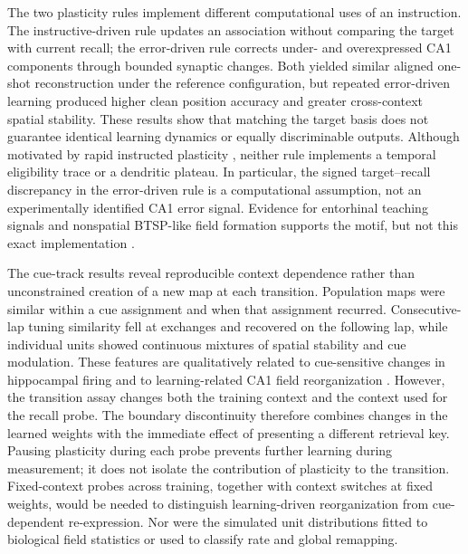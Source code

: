 The two plasticity rules implement different computational uses of an
instruction. The instructive-driven rule updates an association without
comparing the target with current recall; the error-driven rule corrects
under- and overexpressed CA1 components through bounded synaptic changes.
Both yielded similar aligned one-shot reconstruction under the reference
configuration, but repeated error-driven learning produced higher clean
position accuracy and greater cross-context spatial stability. These results
show that matching the target basis does not guarantee identical learning
dynamics or equally discriminable outputs. Although motivated by rapid
instructed plasticity \citep{bittner2017,milstein2021,wu2025}, neither rule
implements a temporal eligibility trace or a dendritic plateau. In
particular, the signed target--recall discrepancy in the error-driven rule
is a computational assumption, not an experimentally identified CA1 error
signal. Evidence for entorhinal teaching signals and nonspatial BTSP-like
field formation supports the motif, but not this exact implementation
\citep{grienberger2022,dorian2026a}.

The cue-track results reveal reproducible context dependence rather than
unconstrained creation of a new map at each transition. Population maps were
similar within a cue assignment and when that assignment recurred.
Consecutive-lap tuning similarity fell at exchanges and recovered on the
following lap, while individual units showed continuous mixtures of spatial
stability and cue modulation. These features are qualitatively related to
cue-sensitive changes in hippocampal firing \citep{muller1987,leutgeb2005}
and to learning-related CA1 field reorganization
\citep{grienberger2022,madar2025,vaidya2025}. However, the transition assay
changes both the training context and the context used for the recall probe.
The boundary discontinuity therefore combines changes in the learned weights
with the immediate effect of presenting a different retrieval key. Pausing
plasticity during each probe prevents further learning during measurement;
it does not isolate the contribution of plasticity to the transition.
Fixed-context probes across training, together with context switches at fixed
weights, would be needed to distinguish learning-driven reorganization from
cue-dependent re-expression. Nor were the simulated unit distributions fitted
to biological field statistics or used to classify rate and global remapping.

